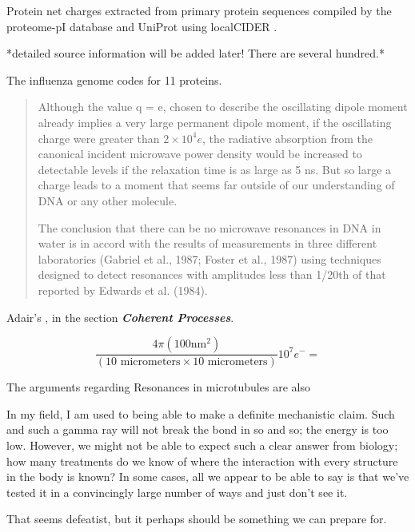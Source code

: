 \documentclass[paper.tex]{subfiles}
\begin{document}
Protein net charges extracted from primary protein sequences compiled by the proteome-pI database \cite{ProteomepI2017} and UniProt using localCIDER \cite{CIDER2017} . 

*detailed source information will be added later! There are several hundred.*

The influenza genome codes for 11 proteins.

\cite{Vibrational2002}
\begin{quote}
Although the value q = e, chosen to describe the oscillating dipole moment already implies a very large permanent dipole moment, if the oscillating charge were greater
than $2\times 10^4 e$, the radiative absorption from the canonical
incident microwave power density would be increased to
detectable levels if the relaxation time is as large as 5 ns.
But so large a charge leads to a moment that seems far
outside of our understanding of DNA or any other molecule.


The conclusion that there can be no microwave resonances in DNA in water is in accord with the results of
measurements in three different laboratories (Gabriel et al.,
1987; Foster et al., 1987) using techniques designed to
detect resonances with amplitudes less than 1/20th of that
reported by Edwards et al. (1984).
\end{quote}

Adair's \cite{Vibrational2002}, in the section {\it \bf Coherent Processes}. 

$$\frac{4 \pi (100 \text{nm}^2)}{(10 \text{ micrometers} \times 10 \text{ micrometers})} 10^7 e^- = $$

The arguments regarding Resonances in microtubules are also 




In my field, I am used to being able to make a definite mechanistic claim. Such and such a gamma ray will not break the bond in so and so; the energy is too low. However, we might not be able to expect such a clear answer from biology; how many treatments do we know of where the interaction with every structure in the body is known? In some cases, all we appear to be able to say is that we've tested it in a convincingly large number of ways and just don't see it.

That seems defeatist, but it perhaps should be something we can prepare for.


\cite{Identification2018}
\end{document}
